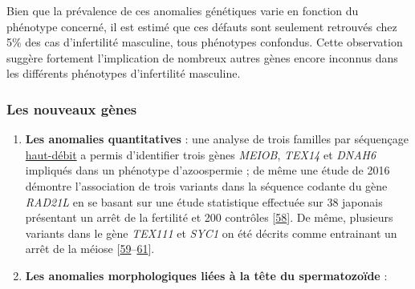 \documentclass[12pt,twoside]{reedthesis}
\theoremstyle{definition}
\theoremstyle{definition}
\theoremstyle{remark}
\begin{document}
  Bien que la prévalence de ces anomalies génétiques varie en fonction du
  phénotype concerné, il est estimé que ces défauts sont seulement
  retrouvés chez 5\% des cas d'infertilité masculine, tous phénotypes
  confondus. Cette observation suggère fortement l'implication de nombreux
  autres gènes encore inconnus dans les différents phénotypes
  d'infertilité masculine.
  
  \newpage
  
  \subsubsection{Les nouveaux gènes}\label{les-nouveaux-genes}
  
  \begin{enumerate}
  \def\labelenumi{\arabic{enumi}.}
  \item
    \textbf{Les anomalies quantitatives} : une analyse de trois familles
    par séquençage \protect\hyperlink{ngs}{haut-débit} a permis
    d'identifier trois gènes \emph{MEIOB}, \emph{TEX14} et \emph{DNAH6}
    impliqués dans un phénotype d'azoospermie ; de même une étude de 2016
    démontre l'association de trois variants dans la séquence codante du
    gène \emph{RAD21L} en se basant sur une étude statistique effectuée
    sur 38 japonais présentant un arrêt de la fertilité et 200 contrôles
    {[}\protect\hyperlink{ref-Minase2017}{58}{]}. De même, plusieurs
    variants dans le gène \emph{TEX111} et \emph{SYC1} on été décrits
    comme entrainant un arrêt de la méiose
    {[}\protect\hyperlink{ref-Yatsenko2015}{59}--\protect\hyperlink{ref-Maor-Sagie2015}{61}{]}.
  \item
    \textbf{Les anomalies morphologiques liées à la tête du spermatozoïde}
    :
  

\end{enumerate}
\end{document}
